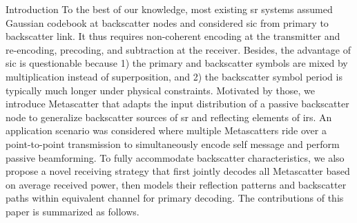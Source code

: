 \documentclass[journal]{IEEEtran}
\begin{document}
\begin{section}{Introduction}
	To the best of our knowledge, most existing \gls{sr} systems \cite{Yang2018,Guo2019b,Ding2020,Long2020a,Zhou2019a,Wu2021a,Xu2021a} assumed Gaussian codebook at backscatter nodes and considered \gls{sic} from primary to backscatter link.
	It thus requires non-coherent encoding at the transmitter and re-encoding, precoding, and subtraction at the receiver.
	Besides, the advantage of \gls{sic} is questionable because 1) the primary and backscatter symbols are mixed by multiplication instead of superposition, and 2) the backscatter symbol period is typically much longer under physical constraints.
	Motivated by those, we introduce Metascatter that adapts the input distribution of a passive backscatter node to generalize backscatter sources of \gls{sr} and reflecting elements of \gls{irs}.
	An application scenario was considered where multiple Metascatters ride over a point-to-point transmission to simultaneously encode self message and perform passive beamforming.
	To fully accommodate backscatter characteristics, we also propose a novel receiving strategy that first jointly decodes all Metascatter based on average received power, then models their reflection patterns and backscatter paths within equivalent channel for primary decoding.
	The contributions of this paper is summarized as follows.



\end{section}
\end{document}
